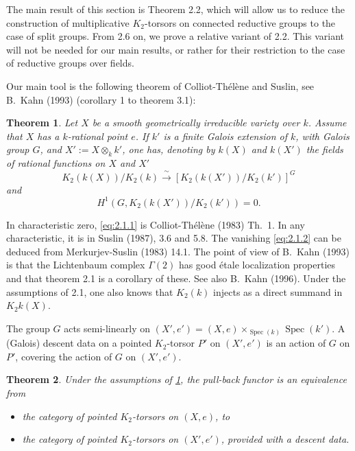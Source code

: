 \documentclass[11pt,a4paper]{article}
\theoremstyle{plain}
\newtheorem{theorem}{Theorem}[section]
\theoremstyle{definition}
\DeclareMathOperator{\Spec}{Spec}
\begin{document}
The main result of this section is Theorem 2.2, which will allow us to reduce the construction of multiplicative $K_2$-torsors on connected reductive groups to the case of split groups. From 2.6 on, we prove a relative variant of 2.2. This variant will not be needed for our main results, or rather for their restriction to the case of reductive groups over fields.

Our main tool is the following theorem of Colliot-Th\'el\`ene and Suslin, see B.~Kahn (1993) (corollary 1 to theorem 3.1):

\begin{theorem}\label{thm:2.1}
Let $X$ be a smooth geometrically irreducible variety over $k$. Assume that $X$ has a $k$-rational point $e$. If $k'$ is a finite Galois extension of $k$, with Galois group $G$, and $X' := X \otimes_k k'$, one has, denoting by $k(X)$ and $k(X')$ the fields of rational functions on $X$ and $X'$
\begin{equation}\label{eq:2.1.1}
K_2(k(X))/K_2(k) \xrightarrow{\;\sim\;} [K_2(k(X'))/K_2(k')]^G
\end{equation}
and
\begin{equation}\label{eq:2.1.2}
H^1(G, K_2(k(X'))/K_2(k')) = 0.
\end{equation}
\end{theorem}

In characteristic zero, \eqref{eq:2.1.1} is Colliot-Th\'el\`ene (1983) Th.~1. In any characteristic, it is in Suslin (1987), 3.6 and 5.8. The vanishing \eqref{eq:2.1.2} can be deduced from Merkurjev-Suslin (1983) 14.1. The point of view of B.~Kahn (1993) is that the Lichtenbaum complex $\Gamma(2)$ has good \'etale localization properties and that theorem 2.1 is a corollary of these. See also B.~Kahn (1996). Under the assumptions of 2.1, one also knows that $K_2(k)$ injects as a direct summand in $K_2k(X)$.

The group $G$ acts semi-linearly on $(X', e') = (X, e) \times_{\Spec(k)} \Spec(k')$. A (Galois) descent data on a pointed $K_2$-torsor $P'$ on $(X', e')$ is an action of $G$ on $P'$, covering the action of $G$ on $(X', e')$.

\begin{theorem}\label{thm:2.2}
Under the assumptions of \ref{thm:2.1}, the pull-back functor is an equivalence from
\begin{itemize}
\item[(a)] the category of pointed $K_2$-torsors on $(X,e)$, to
\item[(b)] the category of pointed $K_2$-torsors on $(X',e')$, provided with a descent data.
\end{itemize}
\end{theorem}
\end{document}
